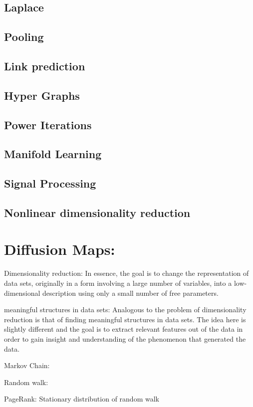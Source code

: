 \subsection{Laplace}
\subsection{Pooling}
\subsection{Link prediction}
\subsection{Hyper Graphs}
\subsection{Power Iterations}
\subsection{Manifold Learning}
\subsection{Signal Processing}
\subsection{Nonlinear dimensionality reduction}


\section{Diffusion Maps:}
\citet{diffusionMaps}
\cite{diffusionMaps}

Dimensionality reduction:
In essence, the goal is to change the representation of data sets, originally in a form involving a large number of variables, into a
low-dimensional description using only a small number of free parameters.

meaningful structures in data sets:
Analogous to the problem of dimensionality reduction is that of finding meaningful structures in data sets. The idea here is slightly
different and the goal is to extract relevant features out of the data in order to gain insight and understanding of the
phenomenon that generated the data.

Markov Chain:

Random walk:

PageRank:
Stationary distribution of random walk

